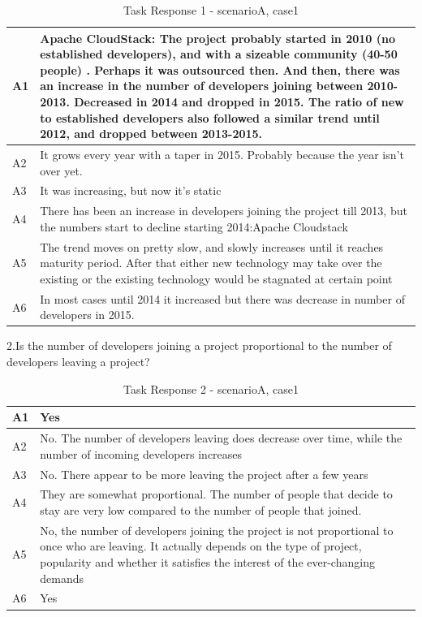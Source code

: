 \documentclass[seploa]{beavtex}
\begin{document}
\begin{table}[H]
\begin{tabular}{ |p{2cm}|p{12cm}| }
 \hline
 A1 & Apache CloudStack: The project probably started in 2010 (no established developers), and with a sizeable community (40-50 people) . Perhaps it was outsourced then. And then, there was an increase in the number of developers joining between 2010-2013. Decreased in 2014 and dropped in 2015. The ratio of new to established developers also followed a similar trend until 2012, and dropped between 2013-2015.\\
 \hline
 A2 & It grows every year with a taper in 2015. Probably because the year isn't over yet.\\ \hline
 A3 & It was increasing, but now it's static\\ \hline
 A4 & There has been an increase in developers joining the project till 2013, but the numbers start to decline starting 2014:Apache Cloudstack\\ \hline
 A5 & The trend moves on pretty slow, and slowly increases until it reaches maturity period. After that either new technology may take over the existing or the existing technology would be stagnated at certain point\\ \hline
 A6 & In most cases until 2014 it increased but there was decrease in number of developers in 2015.\\
 \hline
\end{tabular}
\caption{Task Response 1 - scenarioA, case1}
\label{tab:table1}
\end{table}


2.Is the number of developers joining a project proportional to the number of developers leaving a project?

\begin{table}[H]
\begin{tabular}{ |p{2cm}|p{12cm}| }
 \hline
 A1 & Yes\\
 \hline
 A2 & No. The number of developers leaving does decrease over time, while the number of incoming developers increases\\ \hline
 A3 & No. There appear to be more leaving the project after a few years\\ \hline
 A4 & They are somewhat proportional. The number of people that decide to stay are very low compared to the number of people that joined.\\ \hline
 A5 & No, the number of developers joining the project is not proportional to once who are leaving. It actually depends on the type of project, popularity and whether it satisfies the interest of the ever-changing demands\\ \hline
 A6 & Yes\\
 \hline
\end{tabular}
\caption{Task Response 2 - scenarioA, case1}
\label{tab:table2}
\end{table}
\end{document}
